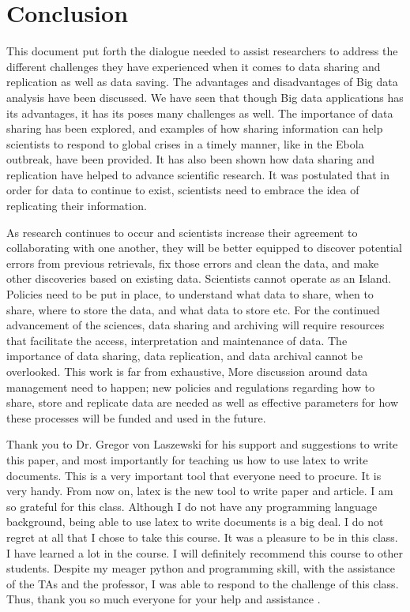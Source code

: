\documentclass[sigconf]{acmart}
\begin{document}
\section{Conclusion}

This document put forth the dialogue needed to assist researchers to address the different challenges they have experienced when it comes to data sharing and replication as well as data saving. The advantages and disadvantages of Big data analysis have been discussed. We have seen that though Big data applications has its advantages, it has its poses many challenges as well. The importance of data sharing has been explored, and examples of how sharing information can help scientists to respond to global crises in a timely manner, like in the Ebola outbreak, have been provided. It has also been shown how data sharing and replication have helped to advance scientific research. It was postulated that in order for data to continue to exist, scientists need to embrace the idea of replicating their information. 

As research continues to occur and scientists increase their agreement to collaborating with one another, they will be better equipped to discover potential errors from previous retrievals, fix those errors and clean the data, and make other discoveries based on existing data. Scientists cannot operate as an Island. Policies need to be put in place, to understand what data to share, when to share, where to store the data, and what data to store etc. For the continued advancement of the sciences, data sharing and archiving will require resources that facilitate the access, interpretation and maintenance of data. The importance of data sharing, data replication, and data archival cannot be overlooked. This work is far from exhaustive, More discussion around data management need to happen; new policies and regulations regarding how to share, store and replicate data  are needed as well as effective parameters for how these processes will be funded and used in the future.



\begin{acks}

  Thank you to Dr. Gregor von Laszewski for his support and suggestions to write this paper, and most importantly for teaching us how to use latex to write documents. This is a very important tool that everyone need to procure. It is very handy. From now on, latex is the new tool to write paper and article. I am so grateful for this class. Although I do not have any programming language background, being able to use latex to write documents is a big deal. I do not regret at all that I chose to take this course. It was a pleasure to be in this class. I have learned a lot in the course. I will definitely recommend this course to other students. Despite my meager python and programming skill, with the assistance of the TAs and the professor, I was able to respond to the challenge of this class. Thus, thank you so much everyone for your help and assistance .  

\end{acks}

\appendix




\end{document}

